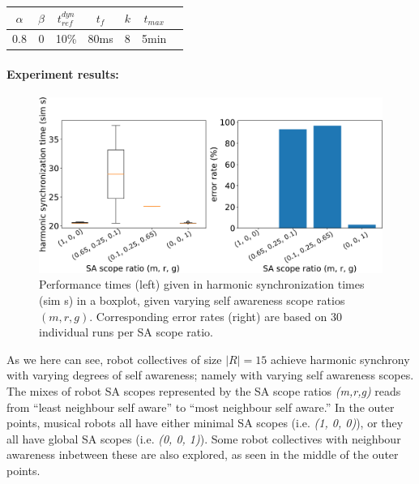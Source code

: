 			\begin{center}
			\begin{tabular}{ |c|c|c|c|c|c|c| } 
			\hline
			$\alpha$ & $\beta$ & $t_{ref}^{dyn}$ & $t_f$ & $k$ & $t_{max}$ \\
			\hline
			0.8 & 0 & 10\% & 80ms & 8 & 5min \\
			\hline
			\end{tabular}
			\label{tab:phase_sync_heterogenous_SA_scopes}
			\end{center}
	
	
			\paragraph{Experiment results:\nl}
			
			\begin{figure}[ht!]
				\centering
				\includegraphics[width=\linewidth]{Assets/DocSegments/Chapters/ExperimentsAndResults/Figures/PerfScores/heterogenous_robots_SA_scopes_experiment.pdf}
				\caption[Experiment results for $\phi$ synchronization heterogenous SA scopes experiment.]{Performance times (left) given in harmonic synchronization times (sim s) in a boxplot, given varying self awareness scope ratios $(m, r, g)$. Corresponding error rates (right) are based on 30 individual runs per SA scope ratio.}
				\label{fig:phase_sync_heterogenous_SA_scopes}
			\end{figure}
			
			As we here can see, robot collectives of size $|R|=15$ achieve harmonic synchrony with varying degrees of self awareness; namely with varying self awareness scopes. The mixes of robot SA scopes represented by the SA scope ratios \textit{(m,r,g)} reads from ``least neighbour self aware'' to ``most neighbour self aware.'' In the outer points, musical robots all have either minimal SA scopes (i.e. \textit{(1, 0, 0)}), or they all have global SA scopes (i.e. \textit{(0, 0, 1)}). Some robot collectives with neighbour awareness inbetween these are also explored, as seen in the middle of the outer points.
			
